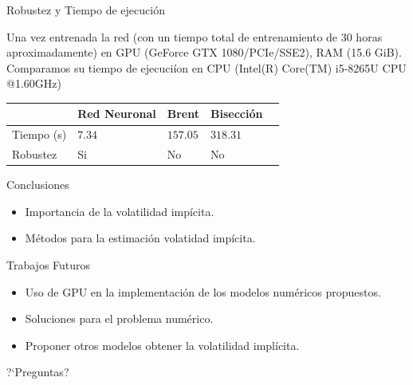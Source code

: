 \documentclass{beamer}
\begin{document}
\begin{frame}{Robustez y Tiempo de ejecuci\'on}
    
    Una vez entrenada la red (con un tiempo total de entrenamiento de 30 horas aproximadamente) en 
    GPU (GeForce GTX 1080/PCIe/SSE2), RAM (15.6 GiB). Comparamos su tiempo de ejecuci\'ion en 
    CPU (Intel(R) Core(TM) i5-8265U CPU @1.60GHz)

    \begin{table}[!htbp]
        \begin{center}
            \begin{tabular}{|l|l|l|l|l|}
                \hline
                 & Red Neuronal & Brent  &  Bisecci\'on  \\ \hline
                Tiempo (s)  & $7.34$  & $157.05$ & $318.31$   \\ \hline
                Robustez & Si  &  No & No \\ \hline
                  
            \end{tabular}
        \end{center}
    \end{table}

\end{frame}


\begin{frame}{Conclusiones}
  \begin{itemize}
    \item Importancia de la volatilidad imp\'icita.
    \item M\'etodos para la estimaci\'on volatidad imp\'icita.
  \end{itemize}
\end{frame}

\begin{frame}{Trabajos Futuros}

  \begin{itemize}
    \item Uso de GPU en la implementaci\'on de los modelos num\'ericos propuestos. 
    \item Soluciones para el problema num\'erico.
    \item Proponer otros modelos obtener la volatilidad impl\'icita.
  \end{itemize}

\end{frame}

\begin{frame}{?`Preguntas?}{}
\end{frame}
\end{document}
